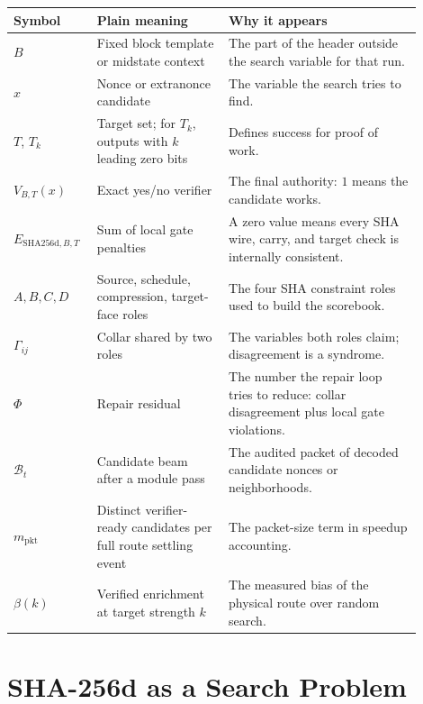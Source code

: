 \documentclass[11pt]{article}
\theoremstyle{definition}
\theoremstyle{remark}
\newcommand{\shaD}{\mathrm{SHA256d}}
\begin{document}
\begin{center}
\begin{minipage}{\linewidth}
\centering
\small
\setlength{\tabcolsep}{3pt}
\begin{tabular}{L{0.16\linewidth}L{0.30\linewidth}L{0.44\linewidth}}
\toprule
Symbol & Plain meaning & Why it appears\\
\midrule
\(B\) & Fixed block template or midstate context & The part of the header outside
the search variable for that run.\\
\(x\) & Nonce or extranonce candidate & The variable the search tries to find.\\
\(T\), \(T_k\) & Target set; for \(T_k\), outputs with \(k\) leading zero bits &
Defines success for proof of work.\\
\(V_{B,T}(x)\) & Exact yes/no verifier & The final authority: \(1\) means the
candidate works.\\
\(E_{\shaD,B,T}\) & Sum of local gate penalties & A zero value means every SHA
wire, carry, and target check is internally consistent.\\
\(A,B,C,D\) & Source, schedule, compression, target-face roles & The four SHA
constraint roles used to build the scorebook.\\
\(\Gamma_{ij}\) & Collar shared by two roles & The variables both roles claim;
disagreement is a syndrome.\\
\(\Phi\) & Repair residual & The number the repair loop tries to reduce:
collar disagreement plus local gate violations.\\
\(\mathcal B_t\) & Candidate beam after a module pass & The audited packet of
decoded candidate nonces or neighborhoods.\\
\(m_{\mathrm{pkt}}\) & Distinct verifier-ready candidates per full route
settling event & The packet-size term in speedup accounting.\\
\(\beta(k)\) & Verified enrichment at target strength \(k\) & The measured bias of
the physical route over random search.\\
\bottomrule
\end{tabular}
\label{tab:symbolmap}
\end{minipage}
\end{center}

\section{SHA-256d as a Search Problem}
\end{document}

